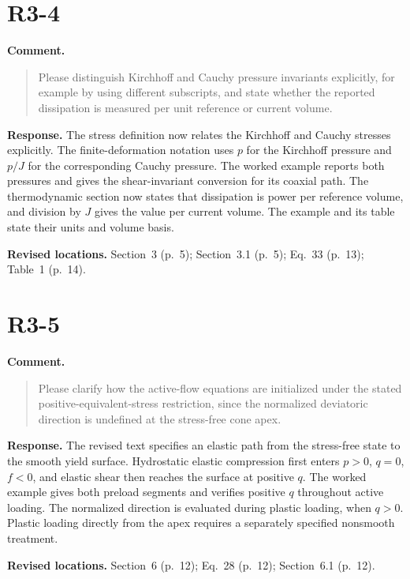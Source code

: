 \documentclass[11pt]{article}
\begin{document}
\section{R3-4}
\textbf{Comment.}\begin{quote}\small
Please distinguish Kirchhoff and Cauchy pressure invariants explicitly, for example by using different subscripts, and state whether the reported dissipation is measured per unit reference or current volume.
\end{quote}
\textbf{Response.} The stress definition now relates the Kirchhoff and Cauchy
stresses explicitly. The finite-deformation notation uses \(p\) for the
Kirchhoff pressure and \(p/J\) for the corresponding Cauchy pressure. The
worked example reports both pressures and gives the shear-invariant conversion
for its coaxial path. The thermodynamic section now states that dissipation is
power per reference volume, and division by \(J\) gives the value per current
volume. The example and its table state their units and volume basis.

\textbf{Revised locations.} Section~3 (p.~5); Section~3.1 (p.~5); Eq.~33 (p.~13); Table~1 (p.~14).
\section{R3-5}
\textbf{Comment.}\begin{quote}\small
Please clarify how the active-flow equations are initialized under the stated positive-equivalent-stress restriction, since the normalized deviatoric direction is undefined at the stress-free cone apex.
\end{quote}
\textbf{Response.} The revised text specifies an elastic path from the
stress-free state to the smooth yield surface. Hydrostatic elastic compression
first enters \(p>0\), \(q=0\), \(f<0\), and elastic shear then reaches the
surface at positive \(q\). The worked example gives both preload segments and
verifies positive \(q\) throughout active loading. The normalized direction is
evaluated during plastic loading, when \(q>0\). Plastic loading directly from
the apex requires a separately specified nonsmooth treatment.

\textbf{Revised locations.} Section~6 (p.~12); Eq.~28 (p.~12); Section~6.1 (p.~12).
\end{document}
